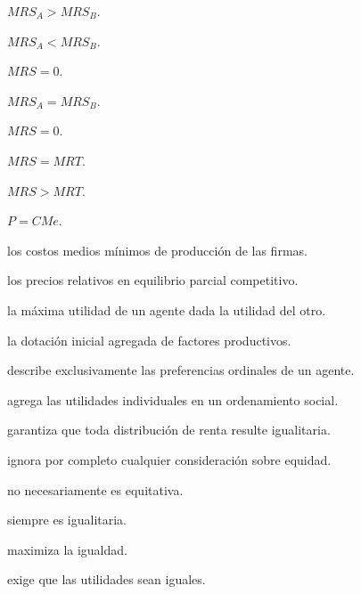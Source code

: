 \begin{opts}
    \item $MRS_A>MRS_B$.
    \item $MRS_A<MRS_B$.
    \item $MRS=0$.
    \item $MRS_A=MRS_B$.
\end{opts}

\begin{opts}
    \item $MRS=0$.
    \item $MRS=MRT$.
    \item $MRS>MRT$.
    \item $P=CMe$.
\end{opts}

\begin{opts}
    \item los costos medios mínimos de producción de las firmas.
    \item los precios relativos en equilibrio parcial competitivo.
    \item la máxima utilidad de un agente dada la utilidad del otro.
    \item la dotación inicial agregada de factores productivos.
\end{opts}

\begin{opts}
    \item describe exclusivamente las preferencias ordinales de un agente.
    \item agrega las utilidades individuales en un ordenamiento social.
    \item garantiza que toda distribución de renta resulte igualitaria.
    \item ignora por completo cualquier consideración sobre equidad.
\end{opts}

\begin{opts}
    \item no necesariamente es equitativa.
    \item siempre es igualitaria.
    \item maximiza la igualdad.
    \item exige que las utilidades sean iguales.
\end{opts}

